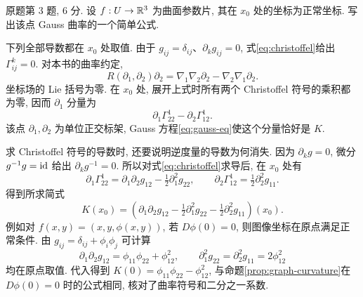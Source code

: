 \begin{exercise}\label{ps:7-3}
原题第 $3$ 题, $6$ 分. 设 $f:U\to\mathbb R^3$ 为曲面参数片, 其在 $x_0$ 处的坐标为正常坐标. 写出该点 Gauss 曲率的一个简单公式.
\end{exercise}
\begin{solution}
下列全部导数都在 $x_0$ 处取值. 由于 $g_{ij}=\delta_{ij}$、$\partial_k g_{ij}=0$, 式\eqref{eq:christoffel}给出 $\Gamma^k_{ij}=0$. 对本书的曲率约定,
\[
 R(\partial_1,\partial_2)\partial_2
 =\nabla_1\nabla_2\partial_2-\nabla_2\nabla_1\partial_2.
\]
坐标场的 Lie 括号为零. 在 $x_0$ 处, 展开上式时所有两个 Christoffel 符号的乘积都为零, 因而 $\partial_1$ 分量为
\[
 \partial_1\Gamma^1_{22}-\partial_2\Gamma^1_{12}.
\]
该点 $\partial_1,\partial_2$ 为单位正交标架, Gauss 方程\eqref{eq:gauss-eq}使这个分量恰好是 $K$.

求 Christoffel 符号的导数时, 还要说明逆度量的导数为何消失. 因为 $\partial_k g=0$, 微分 $g^{-1}g=\operatorname{id}$ 给出 $\partial_k g^{-1}=0$. 所以对式\eqref{eq:christoffel}求导后, 在 $x_0$ 处有
\[
 \partial_1\Gamma^1_{22}
 =\partial_1\partial_2g_{12}-\tfrac12\partial_1^2g_{22},\qquad
 \partial_2\Gamma^1_{12}=\tfrac12\partial_2^2g_{11}.
\]
得到所求简式
\[
 \boxed{K(x_0)=
 \left(\partial_1\partial_2g_{12}
       -\tfrac12\partial_1^2g_{22}
       -\tfrac12\partial_2^2g_{11}\right)(x_0).}
\]
例如对 $f(x,y)=(x,y,\phi(x,y))$, 若 $D\phi(0)=0$, 则图像坐标在原点满足正常条件. 由 $g_{ij}=\delta_{ij}+\phi_i\phi_j$ 可计算
\[
 \partial_1\partial_2g_{12}=\phi_{11}\phi_{22}+\phi_{12}^2,
 \qquad \partial_1^2g_{22}=\partial_2^2g_{11}=2\phi_{12}^2
\]
均在原点取值. 代入得到 $K(0)=\phi_{11}\phi_{22}-\phi_{12}^2$, 与命题\ref{prop:graph-curvature}在 $D\phi(0)=0$ 时的公式相同, 核对了曲率符号和二分之一系数.
\end{solution}
